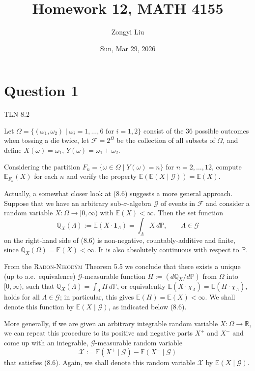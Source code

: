 \documentclass[letterpaper]{article}
\title{Homework 12, MATH 4155}
\author{Zongyi Liu}
\date{Sun, Mar 29, 2026}
\begin{document}
		\maketitle
		\section{Question 1}
		
		
		{\color{deepred} TLN 8.2}
		
		Let $\Omega = \{(\omega_1, \omega_2) \mid \omega_i = 1, \ldots, 6 \text{ for } i = 1, 2\}$ consist of the 36 possible outcomes when tossing a die twice, let $\mathcal{F} = 2^\Omega$ be the collection of all subsets of $\Omega$, and define $X(\omega) = \omega_1$, $Y(\omega) = \omega_1 + \omega_2$.
		
		\indent Considering the partition $F_n = \{\omega \in \Omega \mid Y(\omega) = n\}$ for $n = 2, \ldots, 12$, compute $\mathbb{E}_{F_n}(X)$ for each $n$ and verify the property $\mathbb{E}(\mathbb{E}(X \mid \mathcal{G})) = \mathbb{E}(X)$.
		
		\bigskip
		
		Actually, a somewhat closer look at (8.6) suggests a more general approach. Suppose that we have an arbitrary sub-$\sigma$-algebra $\mathcal{G}$ of events in $\mathcal{F}$ and consider a random variable $X : \Omega \to [0, \infty)$ with $\mathbb{E}(X) < \infty$. Then the set function
		\[
		\mathbb{Q}_X(\Lambda) := \mathbb{E}(X \cdot \mathbf{1}_\Lambda) = \int_\Lambda X \, d\mathbb{P}, \qquad \Lambda \in \mathcal{G}
		\]
		on the right-hand side of (8.6) is non-negative, countably-additive and finite, since $\mathbb{Q}_X(\Omega) = \mathbb{E}(X) < \infty$. It is also absolutely continuous with respect to $\mathbb{P}$.
		
		\indent From the \textsc{Radon-Nikod\'{y}m} Theorem 5.5 we conclude that there exists a unique (up to a.e.\ equivalence) $\mathcal{G}$-measurable function $H := (d\mathbb{Q}_X / d\mathbb{P})$ from $\Omega$ into $[0, \infty)$, such that $\mathbb{Q}_X(\Lambda) = \int_\Lambda H \, d\mathbb{P}$, or equivalently $\mathbb{E}(X \cdot \chi_\Lambda) = \mathbb{E}(H \cdot \chi_\Lambda)$, holds for all $\Lambda \in \mathcal{G}$; in particular, this gives $\mathbb{E}(H) = \mathbb{E}(X) < \infty$. We shall denote this function by $\mathbb{E}(X \mid \mathcal{G})$, as indicated below (8.6).
		
		\indent More generally, if we are given an arbitrary integrable random variable $X : \Omega \to \mathbb{R}$, we can repeat this procedure to its positive and negative parts $X^+$ and $X^-$ and come up with an integrable, $\mathcal{G}$-measurable random variable
		\[
		\mathcal{X} := \mathbb{E}(X^+ \mid \mathcal{G}) - \mathbb{E}(X^- \mid \mathcal{G})
		\]
		that satisfies (8.6). Again, we shall denote this random variable $\mathcal{X}$ by $\mathbb{E}(X \mid \mathcal{G})$.
		
\end{document}
